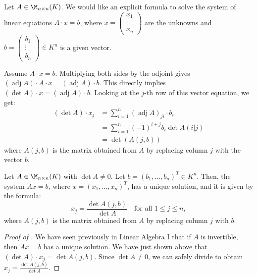Let $A \in \M_{n \times n}(K)$. We would like an explicit formula to solve the system of linear equations $A \cdot x = b$, where $x = \left(\begin{smallmatrix} x_1 \\ \vdots \\ x_n \end{smallmatrix}\right)$ are the unknowns and $b = \left(\begin{smallmatrix} b_1 \\ \vdots \\ b_n \end{smallmatrix}\right) \in K^n$ is a given vector.

Assume $A \cdot x = b$. Multiplying both sides by the adjoint gives $(\operatorname{adj} A) \cdot A \cdot x = (\operatorname{adj} A) \cdot b$. This directly implies $(\det A) \cdot x = (\operatorname{adj} A) \cdot b$.
Looking at the $j$-th row of this vector equation, we get:
\begin{align*}
  (\det A) \cdot x_j &= \sum_{i=1}^n (\operatorname{adj} A)_{ji} \cdot b_i \\
  &= \sum_{i=1}^n (-1)^{i+j} b_i \det A(i|j) \\
  &= \det(A(j, b))
\end{align*}
where $A(j, b)$ is the matrix obtained from $A$ by replacing column $j$ with the vector $b$.

\begin{theorem}
  \label{thm:cramers_rule}
  Let $A \in \M_{n \times n}(K)$ with $\det A \neq 0$. Let $b = (b_1, \dots, b_n)^T \in K^n$. Then, the system $A x = b$, where $x = (x_1, \dots, x_n)^T$, has a unique solution, and it is given by the formula:
  \[
  x_j = \frac{\det A(j, b)}{\det A} \quad \text{for all } 1 \le j \le n,
  \]
  where $A(j,b)$ is the matrix obtained from $A$ by replacing column $j$ with $b$.
\end{theorem}

\begin{proof}[Proof of ]
  We have seen previously in Linear Algebra I that if $A$ is invertible, then $A x = b$ has a unique solution. We have just shown above that $(\det A) \cdot x_j = \det A(j, b)$. Since $\det A \neq 0$, we can safely divide to obtain $x_j = \frac{\det A(j, b)}{\det A}$.
\end{proof}

